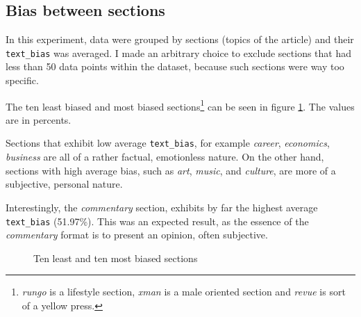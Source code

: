 \newpage
\subsection{Bias between sections}\label{commentary_bias}
In this experiment, data were grouped by sections (topics of the article) and their \verb|text_bias| was averaged. I made an arbitrary choice to exclude sections that had less than 50 data points within the dataset, because such sections were way too specific.

The ten least biased and most biased sections\footnote{\textit{rungo} is a lifestyle section, \textit{xman} is a male oriented section and \textit{revue} is sort of a yellow press.} can be seen in figure \ref{fig:sections}. The values are in percents.


Sections that exhibit low average \verb|text_bias|, for example \textit{career}, \textit{economics}, \textit{business} are all of a rather factual, emotionless nature.
On the other hand, sections with high average bias, such as \textit{art}, \textit{music}, and \textit{culture}, are more of a subjective, personal nature.

Interestingly, the \textit{commentary} section, exhibits by far the highest average \verb|text_bias| (51.97\%). This was an expected result, as the essence of the \textit{commentary} format is to present an opinion, often subjective.

%

\begin{figure}%
    \centering
    \qquad
    \caption{Ten least and ten most biased sections}%
    \label{fig:sections}%
\end{figure}



